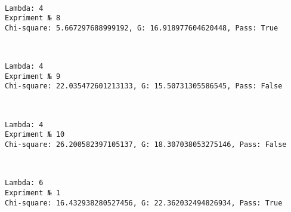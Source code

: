\documentclass[11pt]{article}
\begin{document}
    \begin{center}
    \end{center}
    { \hspace*{\fill} \\}
    
    \begin{Verbatim}[commandchars=\\\{\}]
Lambda: 4
Expriment № 8
Chi-square: 5.667297688999192, G: 16.918977604620448, Pass: True
    \end{Verbatim}

    \begin{center}
    \end{center}
    { \hspace*{\fill} \\}
    
    \begin{Verbatim}[commandchars=\\\{\}]
Lambda: 4
Expriment № 9
Chi-square: 22.035472601213133, G: 15.50731305586545, Pass: False
    \end{Verbatim}

    \begin{center}
    \end{center}
    { \hspace*{\fill} \\}
    
    \begin{Verbatim}[commandchars=\\\{\}]
Lambda: 4
Expriment № 10
Chi-square: 26.200582397105137, G: 18.307038053275146, Pass: False
    \end{Verbatim}

    \begin{center}
    \end{center}
    { \hspace*{\fill} \\}
    
    \begin{Verbatim}[commandchars=\\\{\}]
Lambda: 6
Expriment № 1
Chi-square: 16.432938280527456, G: 22.362032494826934, Pass: True
    \end{Verbatim}
\end{document}
